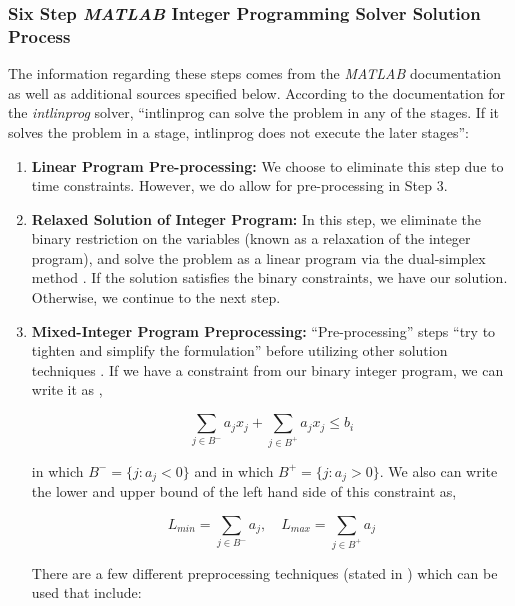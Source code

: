 \documentclass[11pt]{article}
\begin{document}
\subsubsection{Six Step \textit{MATLAB} Integer Programming Solver Solution Process}

The information regarding these steps comes from the \textit{MATLAB} documentation \cite{matlab_doc_opts, matlab_doc_IP} as well as additional sources specified below.  According to the documentation for the \textit{intlinprog} solver, ``intlinprog can solve the problem in any of the stages. If it solves the problem in a stage, intlinprog does not execute the later stages'':

\begin{enumerate}

\item \textbf{Linear Program Pre-processing:} We choose to eliminate this step due to time constraints.  However, we do allow for pre-processing in Step 3.

\item \textbf{Relaxed Solution of Integer Program:} In this step, we eliminate the binary restriction on the variables (known as a relaxation of the integer program), and solve the problem as a linear program via the dual-simplex method \cite{LPOR_textbook, matlab_doc_IP}.  If the solution satisfies the binary constraints, we have our solution.  Otherwise, we continue to the next step.  

\item \textbf{Mixed-Integer Program Preprocessing:} ``Pre-processing'' steps ``try to tighten and simplify the formulation'' before utilizing other solution techniques \cite{IP_textbook}. If we have a constraint from our binary integer program, we can write it as \cite{IP_textbook}, 

\[ \sum_{j \in B^{-}} a_{j} x_{j} + \sum_{j \in B^{+}} a_{j} x_{j} \leq b_{i} \]

\noindent in which $B^{-} = \{j : a_{j} < 0\}$ and in which $B^{+} = \{j : a_{j} > 0 \} $.  We also can write the lower and upper bound of the left hand side of this constraint as,


\[ L_{min} = \sum_{j \in B^{-}} a_{j}, \hspace{1em} L_{max} = \sum_{j \in B^{+}} a_{j} \]

There are a few different preprocessing techniques (stated in \cite{IP_textbook}) which can be used that include:


\end{enumerate}
\end{document}

